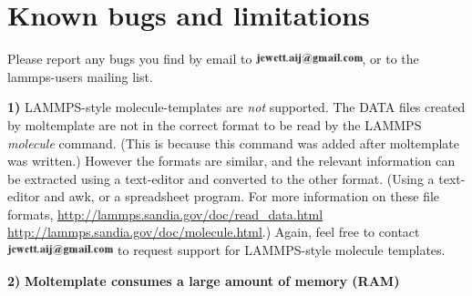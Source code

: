 \documentclass[11pt]{article}
\begin{document}



\section{Known bugs and limitations}
\label{sec:limitations}

Please report any bugs you find by email to 
\includegraphics[height=0.3cm]{author_email.png},
or to the lammps-users mailing list.

\textbf{1)} LAMMPS-style molecule-templates are \textit{not} supported.
The DATA files created by moltemplate are not 
in the correct format to be read by the LAMMPS \textit{molecule} command.
(This is because this command was added after moltemplate was written.)
However the formats are similar, and the relevant information can be extracted
using a text-editor and converted to the other format.
(Using a text-editor and awk, or a spreadsheet program.
For more information on these file formats, 
\url{http://lammps.sandia.gov/doc/read_data.html}
\url{http://lammps.sandia.gov/doc/molecule.html}.)
Again, feel free to contact \includegraphics[height=0.3cm]{author_email.png}
to request support for LAMMPS-style molecule templates.


\textbf{2)} \textbf{Moltemplate consumes a large amount of memory (RAM)}
\end{document}
